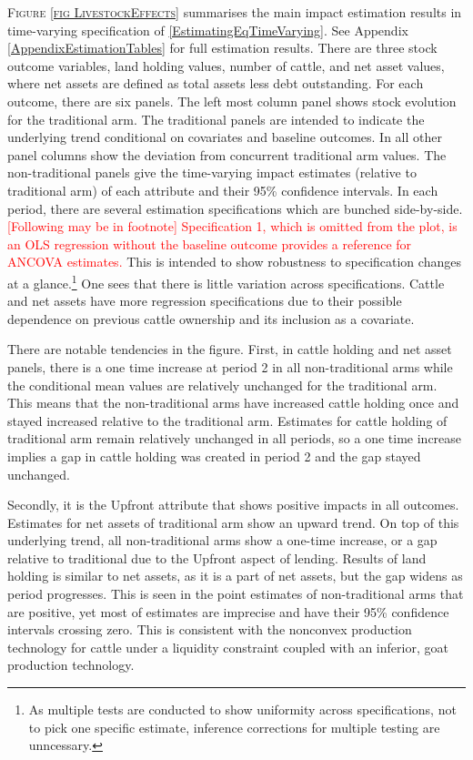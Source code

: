 	\textsc{\footnotesize Figure \ref{fig LivestockEffects}} summarises the main impact estimation results in time-varying specification of \eqref{EstimatingEqTimeVarying}.  See Appendix \ref{AppendixEstimationTables} for full estimation results. There are three stock outcome variables, land holding values, number of cattle, and net asset values, where net assets are defined as total assets less debt outstanding. For each outcome, there are six panels. The left most column panel shows stock evolution for the \textsf{traditional} arm. The \textsf{traditional} panels are intended to indicate the underlying trend conditional on covariates and baseline outcomes. In all other panel columns show the deviation from concurrent \textsf{traditional} arm values. The non-\textsf{traditional} panels give the time-varying impact estimates (relative to \textsf{traditional} arm) of each attribute and their 95\% confidence intervals. In each period, there are several estimation specifications which are bunched side-by-side. \textcolor{red}{[Following may be in footnote] Specification 1, which is omitted from the plot, is an OLS regression without the baseline outcome provides a reference for ANCOVA estimates.} This is intended to show robustness to specification changes at a glance.\footnote{As multiple tests are conducted to show uniformity across specifications, not to pick one specific estimate, inference corrections for multiple testing are unncessary. } One sees that there is little variation across specifications. Cattle and net assets have more regression specifications due to their possible dependence on previous cattle ownership and its inclusion as a covariate.
	
	There are notable tendencies in the figure. First, in cattle holding and net asset panels, there is a one time increase at period 2 in all non-\textsf{traditional} arms while the conditional mean values are relatively unchanged for the \textsf{traditional} arm. This means that the non-\textsf{traditional} arms have increased cattle holding once and stayed increased relative to the \textsf{traditional} arm. Estimates for cattle holding of \textsf{traditional} arm remain relatively unchanged in all periods, so a one time increase implies a gap in cattle holding was created in period 2 and the gap stayed unchanged. 

	Secondly, it is the \textsf{Upfront} attribute that shows positive impacts in all outcomes. Estimates for net assets of \textsf{traditional} arm show an upward trend. On top of this underlying trend, all non-\textsf{traditional} arms show a one-time increase, or a gap relative to \textsf{traditional} due to the \textsf{Upfront} aspect of lending. Results of land holding is similar to net assets, as it is a part of net assets, but the gap widens as period progresses. This is seen in the point estimates of non-\textsf{traditional} arms that are positive, yet most of estimates are imprecise and have their 95\% confidence intervals crossing zero. This is consistent with the nonconvex production technology for cattle under a liquidity constraint coupled with an inferior, goat production technology.

